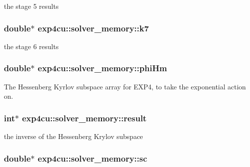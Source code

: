 the stage 5 results 

\subsubsection[{\texorpdfstring{k7}{k7}}]{\setlength{\rightskip}{0pt plus 5cm}double$\ast$ exp4cu\+::solver\+\_\+memory\+::k7}\hypertarget{structexp4cu_1_1solver__memory_aa2776a2d992080e4e4c3e557c26ba2f7}{}\label{structexp4cu_1_1solver__memory_aa2776a2d992080e4e4c3e557c26ba2f7}


the stage 6 results 

\subsubsection[{\texorpdfstring{phi\+Hm}{phiHm}}]{\setlength{\rightskip}{0pt plus 5cm}double$\ast$ exp4cu\+::solver\+\_\+memory\+::phi\+Hm}\hypertarget{structexp4cu_1_1solver__memory_a3278cfbb9029ad325ca304b995097c64}{}\label{structexp4cu_1_1solver__memory_a3278cfbb9029ad325ca304b995097c64}


The Hessenberg Kyrlov subspace array for E\+X\+P4, to take the exponential action on. 

\subsubsection[{\texorpdfstring{result}{result}}]{\setlength{\rightskip}{0pt plus 5cm}int$\ast$ exp4cu\+::solver\+\_\+memory\+::result}\hypertarget{structexp4cu_1_1solver__memory_aa0f66d6db2a4db2d779ff4dc407821b5}{}\label{structexp4cu_1_1solver__memory_aa0f66d6db2a4db2d779ff4dc407821b5}


the inverse of the Hessenberg Krylov subspace 

\subsubsection[{\texorpdfstring{sc}{sc}}]{\setlength{\rightskip}{0pt plus 5cm}double$\ast$ exp4cu\+::solver\+\_\+memory\+::sc}\hypertarget{structexp4cu_1_1solver__memory_afb9f6a3602a177e7283a45afade87695}{}\label{structexp4cu_1_1solver__memory_afb9f6a3602a177e7283a45afade87695}

